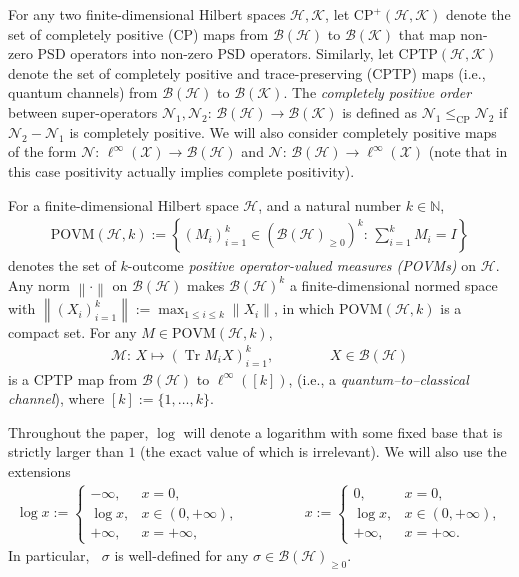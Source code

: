 \documentclass[unsortedaddress,superscriptaddress,pra,notitlepage]{revtex4}
\def\B{{\mathcal B}}
\def\M{\mathcal{M}}
\def\N{\mathcal{N}}
\def\X{{\mathcal X}}
\def\bN{\mathbb{N}}
\def\hil{{\mathcal H}}
\def\kil{{\mathcal K}}
\def\bz{\left(}
\def\jz{\right)}
\def\povm{\mathrm{POVM}}
\def\CP{\mathrm{CP}}
\def\cptp{\mathrm{CPTP}}
\def\p{_{\ge 0}}
\def\cple{\le_{\mathrm{CP}}}
\def\valt{\cdot}
\newcommand{\ki}[1]{\textit{\textit{#1}}}
\newcommand{\ds}{\mbox{ }\mbox{ }}
\newcommand{\norm}[1]{\left\| #1\right\|}
\DeclareMathOperator{\Tr}{Tr}
\DeclareMathOperator{\logn}{\widehat\log}
\begin{document}
For any two finite-dimensional Hilbert spaces $\hil,\kil$, let 
$\CP^+(\hil,\kil)$ denote the set of completely positive (CP) maps 
from 
$\B(\hil)$ to $\B(\kil)$ that map non-zero PSD operators into non-zero 
PSD operators. Similarly, let 
$\cptp(\hil,\kil)$ denote the set of  
completely positive and trace-preserving (CPTP) maps
(i.e., quantum channels)
from $\B(\hil)$ to $\B(\kil)$. 
The \ki{completely positive order} between super-operators 
$\N_1,\N_2:\,\B(\hil)\to\B(\kil)$ is defined as $\N_1\cple\N_2$ if $\N_2-\N_1$ is completely positive.
We will also consider completely positive maps of the form 
$\N:\,\ell^{\infty}(\X)\to\B(\hil)$
and $\N:\,\B(\hil)\to\ell^{\infty}(\X)$
(note that in this case positivity actually implies complete positivity).

For a finite-dimensional Hilbert space $\hil$, and a natural number $k\in\bN$, 
\begin{align*}
\povm(\hil,k):=\left\{
(M_i)_{i=1}^k\in\bz\B(\hil)\p\jz^k:\,\sum\nolimits_{i=1}^k M_i=I
\right\}
\end{align*}
denotes the set of $k$-outcome \ki{positive operator-valued measures (POVMs)} on $\hil$.
Any norm $\norm{\valt}$ on $\B(\hil)$ makes $\B(\hil)^k$ a finite-dimensional normed space
with $\norm{(X_i)_{i=1}^k}:=\max_{1\le i\le k}\norm{X_i}$, in which 
$\povm(\hil,k)$ is a compact set. For any $M\in\povm(\hil,k)$,
\begin{align*}
\M:\,X\mapsto (\Tr M_iX)_{i=1}^k,\ds\ds\ds X\in\B(\hil)
\end{align*}
is a CPTP map from $\B(\hil)$ to $\ell^{\infty}([k])$,
(i.e., a \ki{quantum--to--classical channel}),
where $[k]:=\{1,\ldots,k\}$.

Throughout the paper, $\log$ will denote a logarithm with some fixed base
that is strictly larger than $1$ (the exact value of which is irrelevant).
We will also use the extensions
\begin{align*}
\log x
:=
\begin{cases} 
-\infty,& x=0,\\
\log x,&x\in(0,+\infty),\\
+\infty,&x=+\infty,
\end{cases}
\ds\ds\ds
\logn x:=
\begin{cases} 
0,& x=0,\\
\log x,&x\in(0,+\infty),\\
+\infty,&x=+\infty.
\end{cases}
\end{align*}
In particular, $\logn \sigma$ is well-defined for any $\sigma\in\B(\hil)\p$.
 
\end{document}

